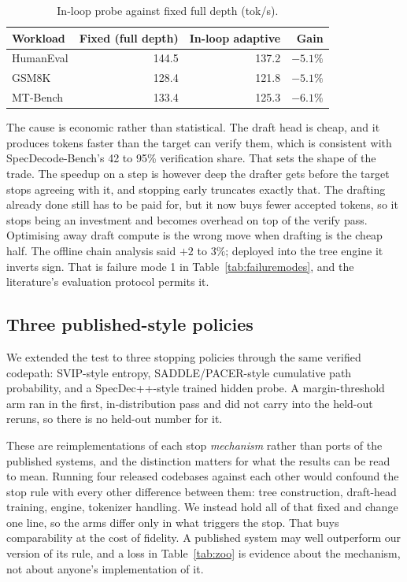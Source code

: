 \documentclass[conference]{IEEEtran}
\begin{document}
\begin{table}[t]
\caption{In-loop probe against fixed full depth (tok/s).}
\label{tab:inloop}
\centering
\small
\begin{tabular}{lrrr}
\toprule
Workload & Fixed (full depth) & In-loop adaptive & Gain \\
\midrule
HumanEval & 144.5 & 137.2 & $-5.1\%$ \\
GSM8K & 128.4 & 121.8 & $-5.1\%$ \\
MT-Bench & 133.4 & 125.3 & $-6.1\%$ \\
\bottomrule
\end{tabular}
\end{table}

The cause is economic rather than statistical. The draft head is cheap, and it produces
tokens faster than the target can verify them, which is consistent with SpecDecode-Bench's 42
to 95\% verification share. That sets the shape of the trade. The speedup on a step is however
deep the drafter gets before the target stops agreeing with it, and stopping early truncates
exactly that. The drafting already done still has to be paid for, but it now buys fewer
accepted tokens, so it stops being an investment and becomes overhead on top of the verify
pass. Optimising away draft compute is the wrong move when drafting is the cheap half. The
offline chain analysis said $+2$ to $3\%$; deployed into the tree engine it inverts sign. That
is failure mode 1 in Table~\ref{tab:failuremodes}, and the literature's evaluation protocol
permits it.

\subsection{Three published-style policies}
\label{sec:zoo}
We extended the test to three stopping policies through the same verified codepath:
SVIP-style entropy, SADDLE/PACER-style cumulative path probability, and a SpecDec++-style
trained hidden probe. A margin-threshold arm ran in the first, in-distribution pass and did
not carry into the held-out reruns, so there is no held-out number for it.

These are reimplementations of each stop \emph{mechanism} rather than ports of the published
systems, and the distinction matters for what the results can be read to mean. Running four
released codebases against each other would confound the stop rule with every other difference
between them: tree construction, draft-head training, engine, tokenizer handling. We instead
hold all of that fixed and change one line, so the arms differ only in what triggers the stop.
That buys comparability at the cost of fidelity. A published system may well outperform our
version of its rule, and a loss in Table~\ref{tab:zoo} is evidence about the mechanism, not
about anyone's implementation of it.
\end{document}
